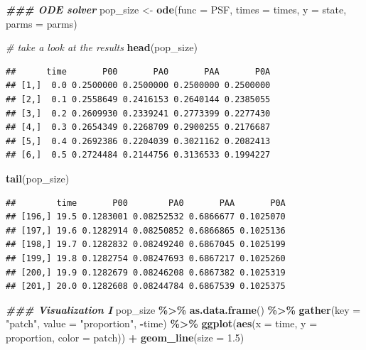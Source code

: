 \documentclass[
]{book}
\newenvironment{Shaded}{\begin{snugshade}}{\end{snugshade}}
\newcommand{\AttributeTok}[1]{\textcolor[rgb]{0.13,0.29,0.53}{#1}}
\newcommand{\CommentTok}[1]{\textcolor[rgb]{0.56,0.35,0.01}{\textit{#1}}}
\newcommand{\DocumentationTok}[1]{\textcolor[rgb]{0.56,0.35,0.01}{\textbf{\textit{#1}}}}
\newcommand{\FloatTok}[1]{\textcolor[rgb]{0.00,0.00,0.81}{#1}}
\newcommand{\FunctionTok}[1]{\textcolor[rgb]{0.13,0.29,0.53}{\textbf{#1}}}
\newcommand{\NormalTok}[1]{#1}
\newcommand{\OtherTok}[1]{\textcolor[rgb]{0.56,0.35,0.01}{#1}}
\newcommand{\SpecialCharTok}[1]{\textcolor[rgb]{0.81,0.36,0.00}{\textbf{#1}}}
\newcommand{\StringTok}[1]{\textcolor[rgb]{0.31,0.60,0.02}{#1}}
\begin{document}
\begin{Shaded}
\begin{Highlighting}[]
\DocumentationTok{\#\#\# ODE solver}
\NormalTok{pop\_size }\OtherTok{\textless{}{-}} \FunctionTok{ode}\NormalTok{(}\AttributeTok{func =}\NormalTok{ PSF, }\AttributeTok{times =}\NormalTok{ times, }\AttributeTok{y =}\NormalTok{ state, }\AttributeTok{parms =}\NormalTok{ parms)}

\CommentTok{\# take a look at the results}
\FunctionTok{head}\NormalTok{(pop\_size)}
\end{Highlighting}
\end{Shaded}

\begin{verbatim}
##      time       P00       PA0       PAA       P0A
## [1,]  0.0 0.2500000 0.2500000 0.2500000 0.2500000
## [2,]  0.1 0.2558649 0.2416153 0.2640144 0.2385055
## [3,]  0.2 0.2609930 0.2339241 0.2773399 0.2277430
## [4,]  0.3 0.2654349 0.2268709 0.2900255 0.2176687
## [5,]  0.4 0.2692386 0.2204039 0.3021162 0.2082413
## [6,]  0.5 0.2724484 0.2144756 0.3136533 0.1994227
\end{verbatim}

\begin{Shaded}
\begin{Highlighting}[]
\FunctionTok{tail}\NormalTok{(pop\_size)}
\end{Highlighting}
\end{Shaded}

\begin{verbatim}
##        time       P00        PA0       PAA       P0A
## [196,] 19.5 0.1283001 0.08252532 0.6866677 0.1025070
## [197,] 19.6 0.1282914 0.08250852 0.6866865 0.1025136
## [198,] 19.7 0.1282832 0.08249240 0.6867045 0.1025199
## [199,] 19.8 0.1282754 0.08247693 0.6867217 0.1025260
## [200,] 19.9 0.1282679 0.08246208 0.6867382 0.1025319
## [201,] 20.0 0.1282608 0.08244784 0.6867539 0.1025375
\end{verbatim}

\begin{Shaded}
\begin{Highlighting}[]
\DocumentationTok{\#\#\# Visualization I}
\NormalTok{pop\_size }\SpecialCharTok{\%\textgreater{}\%}
  \FunctionTok{as.data.frame}\NormalTok{() }\SpecialCharTok{\%\textgreater{}\%}
  \FunctionTok{gather}\NormalTok{(}\AttributeTok{key =} \StringTok{"patch"}\NormalTok{, }\AttributeTok{value =} \StringTok{"proportion"}\NormalTok{, }\SpecialCharTok{{-}}\NormalTok{time) }\SpecialCharTok{\%\textgreater{}\%}
  \FunctionTok{ggplot}\NormalTok{(}\FunctionTok{aes}\NormalTok{(}\AttributeTok{x =}\NormalTok{ time, }\AttributeTok{y =}\NormalTok{ proportion, }\AttributeTok{color =}\NormalTok{ patch)) }\SpecialCharTok{+}
  \FunctionTok{geom\_line}\NormalTok{(}\AttributeTok{size =} \FloatTok{1.5}\NormalTok{)}
\end{Highlighting}
\end{Shaded}
\end{document}
